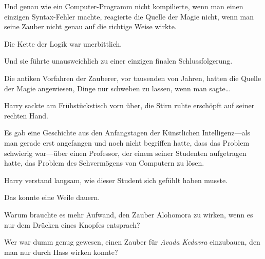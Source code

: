 Und genau wie ein Computer-Programm nicht kompilierte, wenn man einen einzigen Syntax-Fehler machte, reagierte die Quelle der Magie nicht, wenn man seine Zauber nicht genau auf die richtige Weise wirkte.

Die Kette der Logik war unerbittlich.

Und sie führte unausweichlich zu einer einzigen finalen Schlussfolgerung.

Die antiken Vorfahren der Zauberer, vor tausenden von Jahren, hatten die Quelle der Magie angewiesen, Dinge nur schweben zu lassen, wenn man sagte…


Harry sackte am Frühstückstisch vorn über, die Stirn ruhte erschöpft auf seiner rechten Hand.

Es gab eine Geschichte aus den Anfangstagen der Künstlichen Intelligenz—als man gerade erst angefangen und noch nicht begriffen hatte, dass das Problem schwierig war—über einen Professor, der einem seiner Studenten aufgetragen hatte, das Problem des Sehvermögens von Computern zu lösen.

Harry verstand langsam, wie dieser Student sich gefühlt haben musste.

Das konnte eine Weile dauern.

Warum brauchte es mehr Aufwand, den Zauber Alohomora zu wirken, wenn es nur dem Drücken eines Knopfes entsprach?

Wer war dumm genug gewesen, einen Zauber für \emph{Avada Kedavra} einzubauen, den man nur durch Hass wirken konnte?

